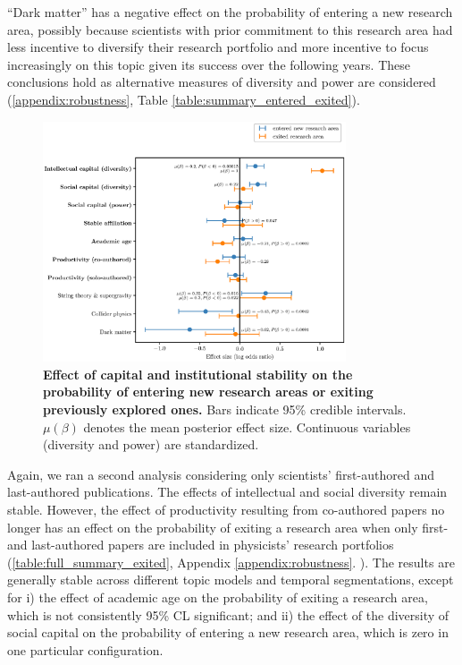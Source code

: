 \documentclass{article}
\begin{document}
``Dark matter'' has a negative effect on the probability of entering a new research area, possibly because scientists with prior commitment to this research area had less incentive to diversify their research portfolio and more incentive to focus increasingly on this topic given its success over the following years. These conclusions hold as alternative measures of diversity and power are considered (\ref{appendix:robustness}, Table \ref{table:summary_entered_exited}).

\begin{figure}[h]
    \centering
    \includegraphics[width=0.8\textwidth]{Fig8}
    \caption{\textbf{Effect of capital and institutional stability on the probability of entering new research areas or exiting previously explored ones.} Bars indicate 95\% credible intervals. $\mu(\beta)$ denotes the mean posterior effect size. Continuous variables (diversity and power) are standardized.}
    \label{fig:diversification_score_effect}
\end{figure}

Again, we ran a second analysis considering only scientists' first-authored and last-authored publications. The effects of intellectual and social diversity remain stable. However, the effect of productivity resulting from co-authored papers no longer has an effect on the probability of exiting a research area when only first- and last-authored papers are included in physicists' research portfolios (\ref{table:full_summary_exited}, Appendix \ref{appendix:robustness}. ). The results are generally stable across different topic models and temporal segmentations, except for i) the effect of academic age on the probability of exiting a research area, which is not consistently 95\% CL significant; and ii) the effect of the diversity of social capital on the probability of entering a new research area, which is zero in one particular configuration.
\end{document}
